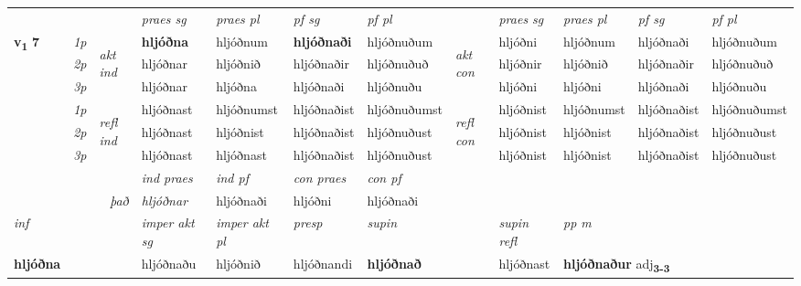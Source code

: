 \begin{longtable}[l]{X>{\footnotesize\itshape}llXXXXlXXXX}
\midrule

 & &   & \textit{praes sg}  & \textit{praes pl}    & \textit{ pf sg} & \textit{pf pl} & & \textit{praes sg}  & \textit{praes pl}    & \textit{pf sg} & \textit{pf pl }  \\ \cmidrule{4-7} \cmidrule{9-12}
 \multirow{2}{*}{{{\textbf{v{\textsubscript{1}}} \Large{\textbf{7}}}}}  & 1p & \multirow{3}{*}{\begin{turn}{90}\textit{akt ind}\end{turn}} & \textbf{hljóðna} & hljóðnum & \textbf{hljóðnaði} & hljóðnuðum & \multirow{3}{*}{\begin{turn}{90}\textit{akt con}\end{turn}} &hljóðni & hljóðnum & hljóðnaði & hljóðnuðum\\*
 & 2p &  &  hljóðnar  & hljóðnið & hljóðnaðir & hljóðnuðuð & & hljóðnir & hljóðnið & hljóðnaðir & hljóðnuðuð \\*
 & 3p &  & hljóðnar & hljóðna & hljóðnaði & hljóðnuðu & & hljóðni & hljóðni& hljóðnaði & hljóðnuðu \\*
\cmidrule{4-7} \cmidrule{9-12}
 & 1p & \multirow{3}{*}{\begin{turn}{90}\textit{refl ind}\end{turn}}  & hljóðnast & hljóðnumst & hljóðnaðist & hljóðnuðumst & \multirow{3}{*}{\begin{turn}{90}\textit{refl con}\end{turn}}  &hljóðnist & hljóðnumst & hljóðnaðist & hljóðnuðumst \\*
 & 2p &  & hljóðnast & hljóðnist & hljóðnaðist & hljóðnuðust & &hljóðnist & hljóðnist & hljóðnaðist & hljóðnuðust \\*
 & 3p  & & hljóðnast & hljóðnast & hljóðnaðist & hljóðnuðust & & hljóðnist & hljóðnist& hljóðnaðist & hljóðnuðust \\*
\cmidrule{4-7} \cmidrule{9-12}

   && &  \textit{ind praes} & \textit{ind pf} & \textit{con praes} & \textit{con pf} \\*
\multicolumn{3}{r}{\textit{það}} & hljóðnar & hljóðnaði & hljóðni & hljóðnaði \\*

\cmidrule{4-7}
   {\textit{inf}} & &  & \textit{imper akt sg} & \textit{imper akt pl}   & \textit{presp} & \textit{supin} && \textit{supin refl} & \textit{pp m} \\*
  {\textbf{hljóðna}} & && hljóðnaðu  & hljóðnið   & hljóðnandi &  \textbf{hljóðnað} && hljóðnast & \multicolumn{2}{l}{\textbf{hljóðnaður} adj\textbf{\textsubscript{3-3}}} \\*


\end{longtable}
